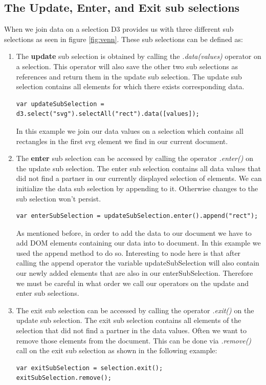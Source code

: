 \documentclass{bioinfo}
\begin{document}
\subsection{The Update, Enter, and Exit sub selections}
When we join data on a selection D3 provides us with three different sub selections as seen in figure \ref{fig:venn}.
These sub selections can be defined as:
\begin{enumerate}
\item The \textbf{update} sub selection is obtained by calling the \textit{.data(values)} operator on a selection. This operator will also save the other two sub selections as references and return them in the update sub selection.
The update sub selection contains all elements for which there exists corresponding data.
\begin{lstlisting}
var updateSubSelection = d3.select("svg").selectAll("rect").data([values]);
\end{lstlisting}
In this example we join our data values on a selection which contains all rectangles in the first svg element we find in our current document.

\item The \textbf{enter} sub selection can be accessed by calling the operator \textit{.enter()} on the update sub selection.
The enter sub selection contains all data values that did not find a partner in our currently displayed selection of elements. We can initialize the data sub selection by appending to it. Otherwise changes to the sub selection won't persist.
\begin{lstlisting}
var enterSubSelection = updateSubSelection.enter().append("rect");
\end{lstlisting}
As mentioned before, in order to add the data to our document we have to add DOM elements containing our data into to document. In this example we used the append method to do so.
Interesting to node here is that after calling the append operator the variable updateSubSelection will also contain our newly added elements that are also in our enterSubSelection.
Therefore we must be careful in what order we call our operators on the update and enter sub selections.

\item The exit sub selection can be accessed by calling the operator \textit{.exit()} on the update sub selection.
The exit sub selection contains all elements of the selection that did not find a partner in the data values.
Often we want to remove those elements from the document. This can be done via \textit{.remove()} call on the exit sub selection as shown in the following example:
\begin{lstlisting}
var exitSubSelection = selection.exit();
exitSubSelection.remove();
\end{lstlisting}
\end{enumerate}
\end{document}

